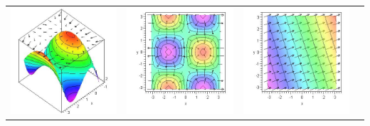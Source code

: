 \begin{center}
\begin{tabular}{cccc}
\includegraphics[width=\mywidth]{08-Optimization/support/levelcurve-2}&
\includegraphics[width=\mywidth]{08-Optimization/support/levelcurve-3}&
\includegraphics[width=\mywidth]{08-Optimization/support/levelcurve-4}&

\end{tabular}
\end{center}

